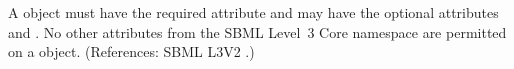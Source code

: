 A \RateRule object must have the required attribute  and
may have the optional attributes   and .  No
other attributes from the SBML Level~3 Core namespace are permitted on a
\RateRule object.  (References: SBML L3V2 .)
